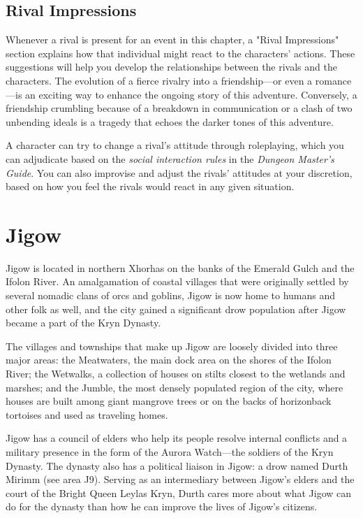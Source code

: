 \documentclass[10pt,a4paper,twoside,fancy,bg=print,twocolumn,openany,nodeprecatedcode]{dndbook}
\begin{document}
\subsection{Rival Impressions}
Whenever a rival is present for an event in this chapter, a "Rival Impressions" section explains how that individual might react to the characters' actions. These suggestions will help you develop the relationships between the rivals and the characters. The evolution of a fierce rivalry into a friendship—or even a romance—is an exciting way to enhance the ongoing story of this adventure. Conversely, a friendship crumbling because of a breakdown in communication or a clash of two unbending ideals is a tragedy that echoes the darker tones of this adventure.

A character can try to change a rival's attitude through roleplaying, which you can adjudicate based on the \textit{social interaction rules} in the \textit{Dungeon Master's Guide}. You can also improvise and adjust the rivals' attitudes at your discretion, based on how you feel the rivals would react in any given situation.

\section{Jigow}
Jigow is located in northern Xhorhas on the banks of the Emerald Gulch and the Ifolon River. An amalgamation of coastal villages that were originally settled by several nomadic clans of orcs and goblins, Jigow is now home to humans and other folk as well, and the city gained a significant drow population after Jigow became a part of the Kryn Dynasty.

The villages and townships that make up Jigow are loosely divided into three major areas: the Meatwaters, the main dock area on the shores of the Ifolon River; the Wetwalks, a collection of houses on stilts closest to the wetlands and marshes; and the Jumble, the most densely populated region of the city, where houses are built among giant mangrove trees or on the backs of horizonback tortoises and used as traveling homes.

Jigow has a council of elders who help its people resolve internal conflicts and a military presence in the form of the Aurora Watch—the soldiers of the Kryn Dynasty. The dynasty also has a political liaison in Jigow: a drow named Durth Mirimm (see area J9). Serving as an intermediary between Jigow's elders and the court of the Bright Queen Leylas Kryn, Durth cares more about what Jigow can do for the dynasty than how he can improve the lives of Jigow's citizens.
\end{document}
